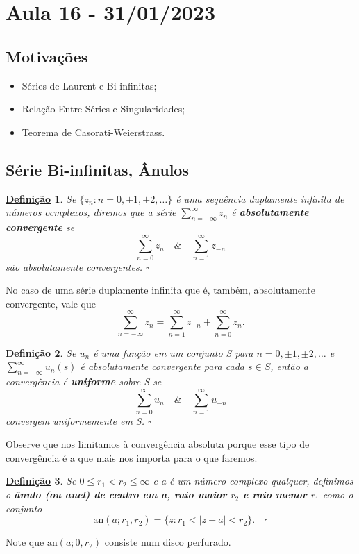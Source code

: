 \documentclass{article}
\newtheorem*{def*}{\underline{Defini\c c\~ao}}
\begin{document}
  \section{Aula 16 - 31/01/2023}
  \subsection{Motivações}
  \begin{itemize}
    \item Séries de Laurent e Bi-infinitas;
    \item Relação Entre Séries e Singularidades;
    \item Teorema de Casorati-Weierstrass.
  \end{itemize}
  \subsection{Série Bi-infinitas, Ânulos}
  \begin{def*}
    Se \(\{z_{n}:n = 0, \pm1, \pm2, \dotsc \}\) é uma sequência duplamente infinita de números ocmplexos, diremos
  que a série \(\sum\limits_{n=-\infty}^{\infty}z_{n}\) é \textbf{absolutamente convergente} se 
    \[
      \sum\limits_{n=0}^{\infty}z_{n}\quad\&\quad \sum\limits_{n=1}^{\infty}z_{-n}
    \]
  são absolutamente convergentes. \(\square\) 
  \end{def*}
  No caso de uma série duplamente infinita que é, também, absolutamente convergente, vale que 
    \[
      \sum\limits_{n=-\infty}^{\infty}z_{n} = \sum\limits_{n=1}^{\infty}z_{-n} + \sum\limits_{n=0}^{\infty}z_{n}.
    \]
  \begin{def*}
    Se \(u_{n}\) é uma função em um conjunto S para \(n=0, \pm1, \pm2, \dotsc \) e \( \sum\limits_{n=-\infty}^{\infty}u_{n}(s)\) é absolutamente convergente 
  para cada \(s\in S\), então a convergência é \textbf{uniforme} sobre S se 
    \[
      \sum\limits_{n=0}^{\infty}u_{n}\quad\&\quad \sum\limits_{n=1}^{\infty}u_{-n}
    \]
  convergem uniformemente em S. \(\square\)
\end{def*}
  Observe que nos limitamos à convergência absoluta porque esse tipo de convergência é a que mais nos importa
para o que faremos.
 \begin{def*}
  Se \(0\leq r_{1}<r_{2}\leq \infty\) e a é um número complexo qualquer, definimos 
o \textbf{ânulo (ou anel) de centro em a, raio maior \(r_{2}\) e raio menor \(r_{1}\)} como o conjunto
    \[
       \mathrm{an}(a; r_{1}, r_{2}) = \{z: r_{1} < |z-a| < r_{2}\}.\quad \square
    \]
 \end{def*}
  Note que \(\mathrm{an}(a; 0, r_{2})\) consiste num disco perfurado.
\end{document}
